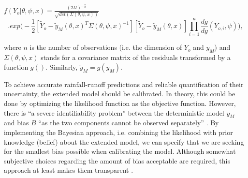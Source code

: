 \documentclass{ctuthesis}\usepackage[]{graphicx}\usepackage[]{color}
\begin{document}
$ f (Y_o|\theta, \psi, x) = \frac{(2\Pi)^{-\frac{n}{2}}}{\sqrt{det(\Sigma(\theta, \psi, x))}} $
\begin{equation}
. exp \Big( -\frac{1}{2}  [ \tilde{Y}_{o} - \tilde{y}_{M}(\theta, x)^{T}  \Sigma(\theta, \psi, x)^{-1} ]  [ \tilde{Y}_{o} - \tilde{y}_{M}(\theta, x)]  \prod^{n}_{i=1} \frac{dg}{dy} (Y_{o,i},\psi) \Big),
\end{equation}

where $n$ is the number of observations (i.e. the dimension of $Y_{o}$ and $y_{M}$) and $\Sigma(\theta, \psi, x)$ stands for a covariance matrix of the residuals transformed by a function $g()$. Similarly, $\tilde{y}_M=g(y_M)$.


To achieve accurate rainfall-runoff predictions and reliable quantification of their uncertainty, the extended model should be calibrated. In theory, this could be done by optimizing the likelihood function as the objective function. However, 
there is \enquote{a severe identifiability problem} between the deterministic model $y_M$ and bias $B$ \enquote{as the two components cannot be observed separately} \citep{reichert2012linking}. By implementing the Bayesian approach, i.e. combining the likelihood with prior knowledge (belief) about the extended model, we can specify that we are seeking for the smallest bias possible when calibrating the model. Although somewhat subjective choices regarding the amount of bias acceptable are required, this approach at least makes them transparent \citep{reichert2012linking}.
\end{document}
